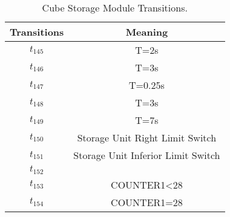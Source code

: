 \begin{table}[htbp]
\caption{Cube Storage Module Transitions.}
\centering
\begin{tabular}{cc}
Transitions & Meaning\\
\hline
\hyperlink{partialNet:tt145}{\hypertarget{partialTable:tt145}{$t_{145}$}} & T=2s\\
\hyperlink{partialNet:tt146}{\hypertarget{partialTable:tt146}{$t_{146}$}} & T=3s\\
\hyperlink{partialNet:tt147}{\hypertarget{partialTable:tt147}{$t_{147}$}} & T=0.25s\\
\hyperlink{partialNet:tt148}{\hypertarget{partialTable:tt148}{$t_{148}$}} & T=3s\\
\hyperlink{partialNet:tt149}{\hypertarget{partialTable:tt149}{$t_{149}$}} & T=7s\\
\hyperlink{partialNet:t150}{\hypertarget{partialTable:t150}{$t_{150}$}} & Storage Unit Right Limit Switch\\
\hyperlink{partialNet:t151}{\hypertarget{partialTable:t151}{$t_{151}$}} & Storage Unit Inferior Limit Switch\\
\hyperlink{partialNet:t152}{\hypertarget{partialTable:t152}{$t_{152}$}} & \\
\hyperlink{partialNet:t153}{\hypertarget{partialTable:t153}{$t_{153}$}} & COUNTER1<28\\
\hyperlink{partialNet:t154}{\hypertarget{partialTable:t154}{$t_{154}$}} & COUNTER1=28\\
\end{tabular}
\end{table}
